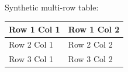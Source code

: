 \documentclass[11pt,a4paper]{article}
\begin{document}
Synthetic multi-row table:

\begin{table}[h]
\begin{tabular}{|l|l|}
\hline
Row 1 Col 1 & Row 1 Col 2 \\ \hline
Row 2 Col 1 & Row 2 Col 2 \\ \hline
Row 3 Col 1 & Row 3 Col 2 \\ \hline
\end{tabular}
\end{table}
\end{document}
